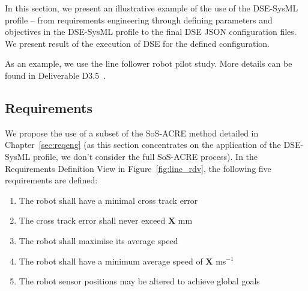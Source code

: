 %
%
%

In this section, we present an illustrative example of the use of the DSE-SysML profile -- from requirements engineering through defining parameters and objectives in the DSE-SysML profile to the final DSE JSON configuration files. We present result of the execution of DSE for the defined configuration.

As an example, we use the line follower robot pilot study. More details can be found in Deliverable D3.5~\cite{INTOCPSD3.5}.

\subsection{Requirements}

We propose the use of a subset of the SoS-ACRE method detailed in Chapter~\ref{sec:reqeng} (as this section concentrates on the application of the DSE-SysML profile, we don't consider the full SoS-ACRE process). In the Requirements Definition View in Figure~\ref{fig:line_rdv}, the following five requirements are defined:

\begin{enumerate}
	\item The robot shall have a minimal cross track error
	\item The cross track error shall never exceed \textbf{X} mm
	\item The robot shall maximise its average speed
	\item The robot shall have a minimum average speed of \textbf{X} ms$^{-1}$
	\item The robot sensor positions may be altered to achieve global goals
\end{enumerate}

